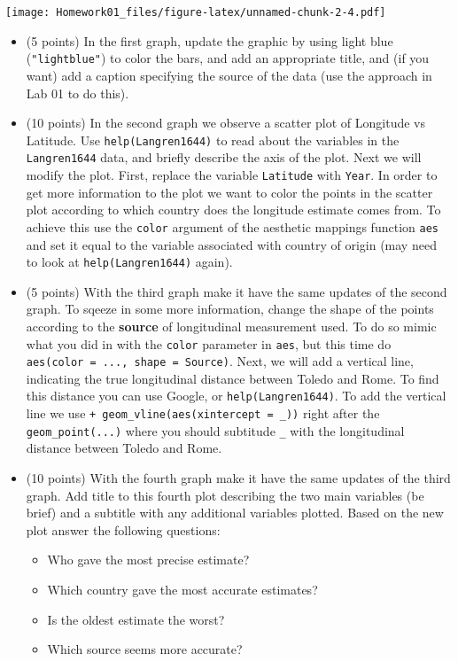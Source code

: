 \documentclass[]{article}
\providecommand{\tightlist}{%
  \setlength{\itemsep}{0pt}\setlength{\parskip}{0pt}}
\begin{document}
\texttt{[image: Homework01\_files/figure-latex/unnamed-chunk-2-4.pdf]}

\begin{itemize}
\item
  (5 points) In the first graph, update the graphic by using light blue
  (\texttt{"lightblue"}) to color the bars, and add an appropriate
  title, and (if you want) add a caption specifying the source of the
  data (use the approach in Lab 01 to do this).
\item
  (10 points) In the second graph we observe a scatter plot of Longitude
  vs Latitude. Use \texttt{help(Langren1644)} to read about the
  variables in the \texttt{Langren1644} data, and briefly describe the
  axis of the plot. Next we will modify the plot. First, replace the
  variable \texttt{Latitude} with \texttt{Year}. In order to get more
  information to the plot we want to color the points in the scatter
  plot according to which country does the longitude estimate comes
  from. To achieve this use the \texttt{color} argument of the aesthetic
  mappings function \texttt{aes} and set it equal to the variable
  associated with country of origin (may need to look at
  \texttt{help(Langren1644)} again).
\item
  (5 points) With the third graph make it have the same updates of the
  second graph. To sqeeze in some more information, change the shape of
  the points according to the \textbf{source} of longitudinal
  measurement used. To do so mimic what you did in with the
  \texttt{color} parameter in \texttt{aes}, but this time do
  \texttt{aes(color\ =\ ...,\ shape\ =\ Source)}. Next, we will add a
  vertical line, indicating the true longitudinal distance between
  Toledo and Rome. To find this distance you can use Google, or
  \texttt{help(Langren1644)}. To add the vertical line we use
  \texttt{+\ geom\_vline(aes(xintercept\ =\ \_))} right after the
  \texttt{geom\_point(...)} where you should subtitude \texttt{\_} with
  the longitudinal distance between Toledo and Rome.
\item
  (10 points) With the fourth graph make it have the same updates of the
  third graph. Add title to this fourth plot describing the two main
  variables (be brief) and a subtitle with any additional variables
  plotted. Based on the new plot answer the following questions:

  \begin{itemize}
  \tightlist
  \item
    Who gave the most precise estimate?
  \item
    Which country gave the most accurate estimates?
  \item
    Is the oldest estimate the worst?
  \item
    Which source seems more accurate?
  \end{itemize}
\end{itemize}
\end{document}
